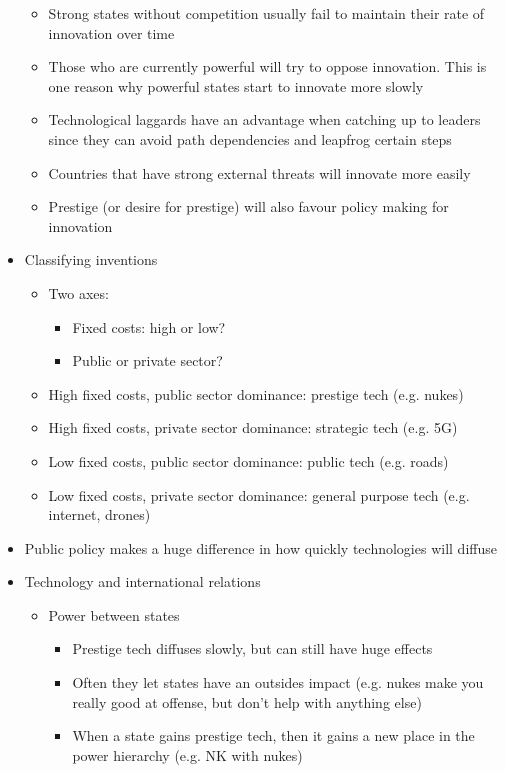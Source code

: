 \documentclass[11pt]{article}
\begin{document}
\begin{itemize}
\begin{itemize}
\item Strong states without competition usually fail to maintain their rate of
innovation over time
\item Those who are currently powerful will try to oppose innovation. This is one
reason why powerful states start to innovate more slowly
\item Technological laggards have an advantage when catching up to leaders since
they can avoid path dependencies and leapfrog certain steps
\item Countries that have strong external threats will innovate more easily
\item Prestige (or desire for prestige) will also favour policy making for innovation
\end{itemize}
\item Classifying inventions
\begin{itemize}
\item Two axes:
\begin{itemize}
\item Fixed costs: high or low?
\item Public or private sector?
\end{itemize}
\item High fixed costs, public sector dominance: prestige tech (e.g. nukes)
\item High fixed costs, private sector dominance: strategic tech (e.g. 5G)
\item Low fixed costs, public sector dominance: public tech (e.g. roads)
\item Low fixed costs, private sector dominance: general purpose tech (e.g.
internet, drones)
\end{itemize}
\item Public policy makes a huge difference in how quickly technologies will diffuse
\item Technology and international relations
\begin{itemize}
\item Power between states
\begin{itemize}
\item Prestige tech diffuses slowly, but can still have huge effects
\item Often they let states have an outsides impact (e.g. nukes make you really
good at offense, but don't help with anything else)
\item When a state gains prestige tech, then it gains a new place in the power
hierarchy (e.g. NK with nukes)
\end{itemize}

\end{itemize}
\end{itemize}
\end{document}
